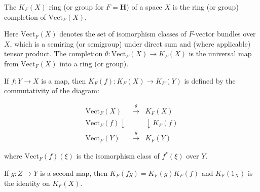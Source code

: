 The $K_F(X)$ ring (or group for $F = \mathbf{H}$) of a space $X$ is the ring (or group) completion of $\text{Vect}_F(X)$.

Here $\text{Vect}_F(X)$ denotes the set of isomorphism classes of $F$-vector bundles over $X$, which is a semiring (or semigroup) under direct sum and (where applicable) tensor product. The completion $\theta: \text{Vect}_F(X) \to K_F(X)$ is the universal map from $\text{Vect}_F(X)$ into a ring (or group).

If $f: Y \to X$ is a map, then $K_F(f): K_F(X) \to K_F(Y)$ is defined by the commutativity of the diagram:

$$
\begin{array}{ccc}
\text{Vect}_F(X) & \xrightarrow{\theta} & K_F(X) \\
\text{Vect}_F(f) \downarrow & & \downarrow K_F(f) \\
\text{Vect}_F(Y) & \xrightarrow{\theta} & K_F(Y)
\end{array}
$$

where $\text{Vect}_F(f)(\xi)$ is the isomorphism class of $f^*(\xi)$ over $Y$.

If $g: Z \to Y$ is a second map, then $K_F(fg) = K_F(g)K_F(f)$ and $K_F(1_X)$ is the identity on $K_F(X)$.

